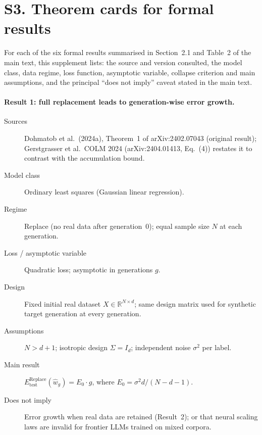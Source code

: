 
\section*{S3. Theorem cards for formal results}

For each of the six formal results summarised in Section~2.1 and Table~2 of the
main text, this supplement lists: the source and version consulted, the model class,
data regime, loss function, asymptotic variable, collapse criterion and main
assumptions, and the principal ``does not imply'' caveat stated in the main text.

\paragraph{Result 1: full replacement leads to generation-wise error growth.}
\begin{description}
\item[Sources]
  Dohmatob et al.\ (2024a), Theorem~1 of arXiv:2402.07043 (original result);
  Gerstgrasser et al.\ COLM 2024 (arXiv:2404.01413, Eq.~(4)) restates it to
  contrast with the accumulation bound.
\item[Model class] Ordinary least squares (Gaussian linear regression).
\item[Regime] Replace (no real data after generation~0); equal sample size $N$ at
  each generation.
\item[Loss / asymptotic variable] Quadratic loss; asymptotic in generations $g$.
\item[Design] Fixed initial real dataset $X \in \mathbb{R}^{N \times d}$; same
  design matrix used for synthetic target generation at every generation.
\item[Assumptions] $N > d+1$; isotropic design $\Sigma = I_d$; independent noise
  $\sigma^2$ per label.
\item[Main result] $E_{\text{test}}^{\text{Replace}}(\hat w_g) = E_0 \cdot g$,
  where $E_0 = \sigma^2 d / (N - d - 1)$.
\item[Does not imply] Error growth when real data are retained (Result~2); or that
  neural scaling laws are invalid for frontier LLMs trained on mixed corpora.
\end{description}

